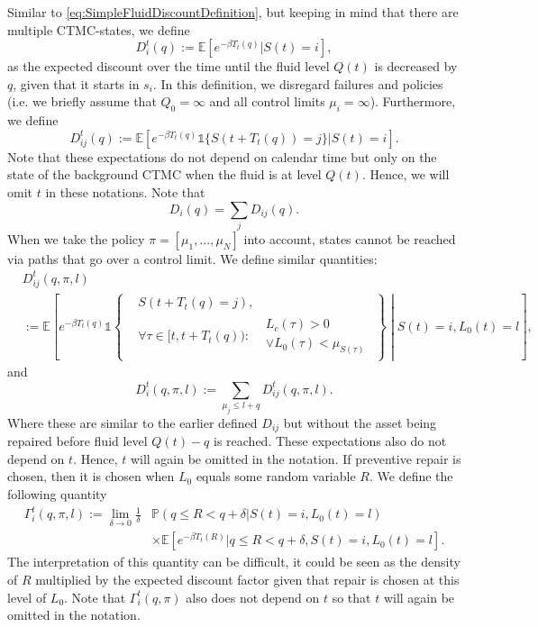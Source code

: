 \documentclass[a4paper]{thesis}
\theoremstyle{definition}
\begin{document}
Similar to \eqref{eq:SimpleFluidDiscountDefinition}, but keeping in mind that there are multiple CTMC-states, we define
\[
D_{i}^t(q):=\mathbb{E}[e^{-\beta T_t(q)}|S(t)=i],
\]
as the expected discount over the time until the fluid level $Q(t)$ is decreased by $q$, given that it starts in $s_i$.
In this definition, we disregard failures and policies (i.e. we briefly assume that $Q_0=\infty$ and all control limits $\mu_i=\infty$).
Furthermore, we define
\[
D_{ij}^t(q):=\mathbb{E}[e^{-\beta T_t(q)}\mathds{1}\{S(t+T_t(q))=j\}|S(t)=i].
\]
Note that these expectations do not depend on calendar time but only on the state of the background CTMC when the fluid is at level $Q(t)$.
Hence, we will omit $t$ in these notations.
Note that
\[
D_{i}(q)=\sum\limits_{j}D_{ij}(q).
\]
When we take the policy $\pi=[\mu_1,...,\mu_N]$ into account, states cannot be reached via paths that go over a control limit.
We define similar quantities:
\[
\begin{split}
&D_{ij}^t(q,\pi,l)\\
&:=\mathbb{E}\left[e^{-\beta T_t(q)}\mathds{1}\left\{\begin{split}
&S(t+T_t(q)=j),\\
&\forall \tau\in[t,t+T_t(q)):
\begin{split}
&L_c(\tau)>0\\&\vee L_0(\tau)<\mu_{S(\tau)}
\end{split}
\end{split}\right\}\middle| S(t)=i,L_0(t)=l\right],
\end{split}
\]
and
\[
D_{i}^t(q,\pi,l):=\sum\limits_{\mu_j\leq l+q}D_{ij}^t(q,\pi,l).
\]
Where these are similar to the earlier defined $D_{ij}$ but without the asset being repaired before fluid level $Q(t)-q$ is reached.
These expectations also do not depend on $t$.
Hence, $t$ will again be omitted in the notation.
If preventive repair is chosen, then it is chosen when $L_0$ equals some random variable $R$.
We define the following quantity
\[
\begin{split}
\Gamma_i^t(q,\pi,l):=\lim\limits_{\delta\rightarrow 0}\frac1\delta&\mathbb{P}(q\leq R<q+\delta|S(t)=i,L_0(t)=l)\\
&\times\mathbb{E}[e^{-\beta T_t(R)}|q\leq R<q+\delta,S(t)=i,L_0(t)=l].
\end{split}
\]
The interpretation of this quantity can be difficult, it could be seen as the density of $R$ multiplied by the expected discount factor given that repair is chosen at this level of $L_0$.
Note that $\Gamma_i^t(q,\pi)$ also does not depend on $t$ so that $t$ will again be omitted in the notation.
\end{document}
